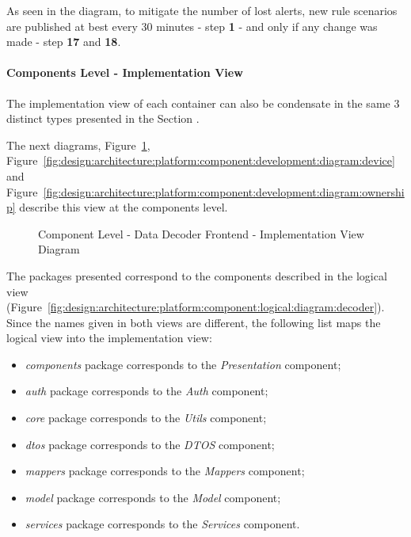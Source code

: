 As seen in the diagram, to mitigate the number of lost alerts, new rule scenarios are published at best every 30 minutes - step \textbf{1} - and only if any change was made - step \textbf{17} and \textbf{18}.

\paragraph{Components Level - Implementation View}
\label{par:design:architecture:platform:components:development}

The implementation view of each container can also be condensate in the same 3 distinct types presented in the Section .

The next diagrams, Figure~\ref{fig:design:architecture:platform:component:development:diagram:decoder}, Figure~\ref{fig:design:architecture:platform:component:development:diagram:device} and Figure~\ref{fig:design:architecture:platform:component:development:diagram:ownership} describe this view at the components level.

\begin{figure}[H]
   \centering
   \resizebox{\columnwidth}{!}
   {
      
   }
   \caption[Component Level - Data Decoder Frontend - Implementation View Diagram]{Component Level - Data Decoder Frontend - Implementation View Diagram}
   \label{fig:design:architecture:platform:component:development:diagram:decoder}
\end{figure}

The packages presented correspond to the components described in the logical view (Figure~\ref{fig:design:architecture:platform:component:logical:diagram:decoder}). Since the names given in both views are different, the following list maps the logical view into the implementation view:

\begin{itemize}
   \item \textit{components} package corresponds to the \textit{Presentation} component;
   \item \textit{auth} package corresponds to the \textit{Auth} component;
   \item \textit{core} package corresponds to the \textit{Utils} component;
   \item \textit{dtos} package corresponds to the \textit{DTOS} component;
   \item \textit{mappers} package corresponds to the \textit{Mappers} component;
   \item \textit{model} package corresponds to the \textit{Model} component;
   \item \textit{services} package corresponds to the \textit{Services} component.
\end{itemize}

